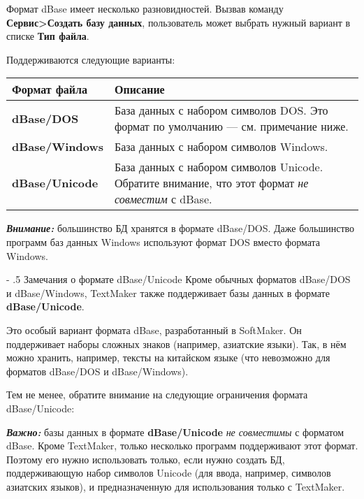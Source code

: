 ﻿\documentclass[a4paper,10pt]{article}
\makeatletter
\renewcommand\paragraph{%
   \@startsection{paragraph}{4}{0mm}%
      {-\baselineskip}%
      {.5\baselineskip}%
      {\normalfont\normalsize\bfseries}}
\makeatother
\begin{document}
Формат dBase имеет несколько разновидностей. Вызвав команду \textbf{Сервис>Создать базу данных}, пользователь может выбрать нужный вариант в списке \textbf{Тип файла}.

Поддерживаются следующие варианты:

\begin{center}
\begin{tabular}{  m{4cm}  m{12cm}  }
 \textbf{Формат файла} & \textbf{Описание}\\ 
 \hline
  \textbf{dBase/DOS} & База данных с набором символов DOS. Это формат по умолчанию — см. примечание ниже.\\
  \textbf{dBase/Windows} & База данных с набором символов Windows.\\ 
\textbf{dBase/Unicode} & База данных с набором символов Unicode. Обратите внимание, что этот формат \textit{не совместим} с dBase.\\
\end{tabular}
\end{center}

\begin{mdframed}[backgroundcolor=blue!10]
\textbf{\textit{Внимание:}} большинство БД хранятся в формате dBase/DOS. Даже большинство программ баз данных Windows используют формат DOS вместо формата Windows.
\end{mdframed}

\paragraph{Замечания о формате dBase/Unicode}
Кроме обычных форматов dBase/DOS и dBase/Windows, TextMaker также поддерживает базы данных в формате \textbf{dBase/Unicode}.

Это особый вариант формата dBase, разработанный в SoftMaker. Он поддерживает наборы сложных знаков (например, азиатские языки). Так, в нём можно хранить, например, тексты на китайском языке (что невозможно для форматов dBase/DOS и dBase/Windows).

Тем не менее, обратите внимание на следующие ограничения формата dBase/Unicode:

\begin{mdframed}[backgroundcolor=blue!10]
\textbf{\textit{Важно:}} базы данных в формате \textbf{dBase/Unicode} \textit{не совместимы} с форматом dBase. Кроме TextMaker, только несколько программ поддерживают этот формат. Поэтому его нужно использовать только, если нужно создать БД, поддерживающую набор символов Unicode (для ввода, например, символов азиатских языков), и предназначенную для использования только с TextMaker.
\end{mdframed}
\end{document}
